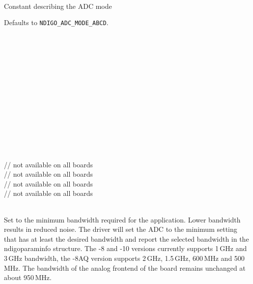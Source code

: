             \\
            Constant describing the ADC mode\par

            Defaults to \texttt{NDIGO\_ADC\_MODE\_ABCD}.\par

            \\
            \\
            \\
            \\
            \\
            \\
            \\
            \\
            \\
            \\
            \\
            \\
            \\
             // not available on all boards\\
             // not available on all boards\\
             // not available on all boards\\
             // not available on all boards\par

            \\
            Set to the minimum bandwidth required for the application. Lower bandwidth results in reduced noise. The driver will set the ADC to the minimum setting that has at least the desired bandwidth and report the selected bandwidth in the \textsf{ndigo\tu param\tu info} structure. The -8 and -10 versions currently supports 1\,GHz and 3\,GHz bandwidth, the -8AQ version supports 2\,GHz, 1.5\,GHz, 600\,MHz and 500\,MHz. The bandwidth of the analog frontend of the board remains unchanged at about 950\,MHz.\par

